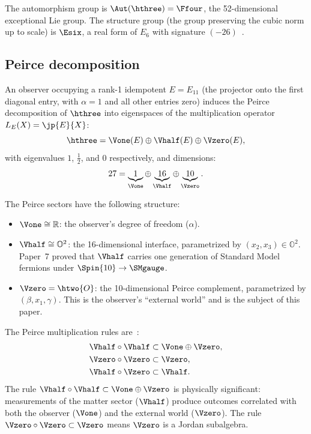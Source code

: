 The automorphism group is $\Aut(\hthree) = \Ffour$, the 52-dimensional
exceptional Lie group. The structure group (the group preserving the
cubic norm up to scale) is $\Esix$, a real form of $E_6$ with
signature $(-26)$~\cite{Freudenthal1954}.

\subsection{Peirce decomposition}
\label{sec:peirce}

An observer occupying a rank-1 idempotent $E = E_{11}$ (the projector
onto the first diagonal entry, with $\alpha = 1$ and all other entries
zero) induces the Peirce decomposition of $\hthree$ into eigenspaces of
the multiplication operator $L_E(X) = \jp{E}{X}$:
\begin{equation}
\label{eq:peirce-decomposition}
\hthree = \Vone(E) \oplus \Vhalf(E) \oplus \Vzero(E),
\end{equation}
with eigenvalues $1$, $\tfrac{1}{2}$, and $0$ respectively, and
dimensions:
\begin{equation}
\label{eq:peirce-dims}
27 = \underbrace{1}_{\Vone} \oplus \underbrace{16}_{\Vhalf}
\oplus \underbrace{10}_{\Vzero}.
\end{equation}

The Peirce sectors have the following structure:
\begin{itemize}
\item $\Vone \cong \mathbb{R}$: the observer's degree of freedom
  ($\alpha$).

\item $\Vhalf \cong \mathbb{O}^2$: the 16-dimensional interface,
  parametrized by $(x_2, x_3) \in \mathbb{O}^2$. Paper~7 proved that
  $\Vhalf$ carries one generation of Standard Model fermions under
  $\Spin{10} \to \SMgauge$.

\item $\Vzero = \htwo{O}$: the 10-dimensional Peirce complement,
  parametrized by $(\beta, x_1, \gamma)$. This is the observer's
  ``external world'' and is the subject of this paper.
\end{itemize}

The Peirce multiplication rules are~\cite{McCrimmon2004}:
\begin{equation}
\label{eq:peirce-rules}
\begin{aligned}
\Vhalf \circ \Vhalf &\subset \Vone \oplus \Vzero, \\
\Vzero \circ \Vzero &\subset \Vzero, \\
\Vhalf \circ \Vzero &\subset \Vhalf.
\end{aligned}
\end{equation}
The rule $\Vhalf \circ \Vhalf \subset \Vone \oplus \Vzero$ is
physically significant: measurements of the matter sector ($\Vhalf$)
produce outcomes correlated with both the observer ($\Vone$) and the
external world ($\Vzero$). The rule $\Vzero \circ \Vzero \subset
\Vzero$ means $\Vzero$ is a Jordan subalgebra.

